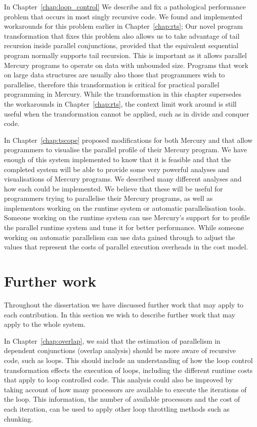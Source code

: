 In Chapter~\ref{chap:loop_control}
We describe and fix a pathological performance problem that occurs in most
singly recursive code.
We found and implemented workarounds for this problem earlier in
Chapter~\ref{chap:rts};
Our novel program transformation that fixes this problem also allows us to
take advantage of tail recursion inside parallel conjunctions,
provided that the equivalent sequential program normally supports tail
recursion.
This is important as it allows parallel Mercury programs to operate on data
with unbounded size.
Programs that work on large data structures are usually also those that
programmers wish to parallelise,
therefore this transformation is critical for practical parallel programming
in Mercury.
While the transformation in this chapter supersedes the workarounds in
Chapter~\ref{chap:rts},
the context limit work around is still useful when the transformation cannot
be applied, such as in divide and conquer code.

In Chapter~\ref{chap:tscope} proposed modifications for both Mercury and
\tscope that allow programmers to visualise the parallel profile of their
Mercury program.
We have enough of this system implemented to know that it is feasible and
that the completed system will be able to provide some very powerful
analyses and visualisations of Mercury programs.
We described many different analyses and how each could be implemented.
We believe that these will be useful for programmers trying to parallelise
their Mercury programs, as well as implementors working on the runtime
system or automatic parallelisation tools.
Someone working on the runtime system can use Mercury's support for \tscope
to profile the parallel runtime system and tune it for better performance.
While someone working on automatic parallelism can use data gained through
\tscope to adjust the values that represent the costs of parallel execution
overheads in the cost model.

\section{Further work}

Throughout the dissertation we have discussed further work that may apply to
each contribution.
In this section we wish to describe further work that may apply to the whole
system.

In Chapter~\ref{chap:overlap},
we said that the estimation of parallelism in dependent conjunctions
(overlap analysis) should be more aware of recursive code, such as loops.
This should include an understanding of how the loop control transformation
effects the execution of loops,
including the different runtime costs that apply to loop controlled code.
This analysis could also be improved by taking account of how many
processors are available to execute the iterations of the loop.
This information,
the number of available processors and the cost of each iteration,
can be used to apply other loop throttling methods such as
chunking.

